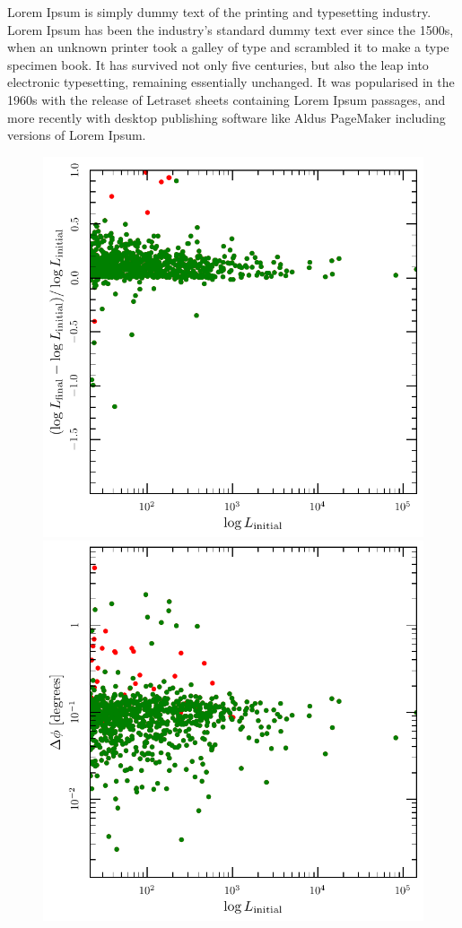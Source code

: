\documentclass[useAMS,usenatbib]{mn2e}
\begin{document}
Lorem Ipsum is simply dummy text of the printing and typesetting
industry. Lorem Ipsum has been the industry's standard dummy text ever
since the 1500s, when an unknown printer took a galley of type and
scrambled it to make a type specimen book. It has survived not only
five centuries, but also the leap into electronic typesetting,
remaining essentially unchanged. It was popularised in the 1960s with
the release of Letraset sheets containing Lorem Ipsum passages, and
more recently with desktop publishing software like Aldus PageMaker
including versions of Lorem Ipsum.

\begin{figure}
  \includegraphics[width=\columnwidth]{changelogL}
  \includegraphics[width=\columnwidth]{change_position}

\end{figure}
\end{document}
